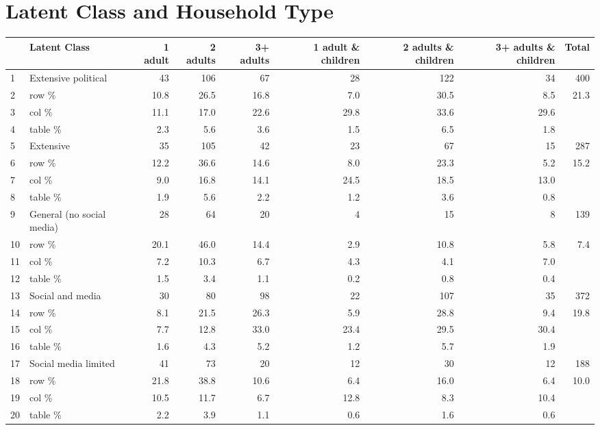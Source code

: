 \documentclass{article}
\begin{document}
\section{Latent Class and Household Type}

\begin{table}[ht]
\centering
\begin{tabular}{llrrrrrrr}
  \hline
 & Latent Class & 1 adult & 2 adults & 3+ adults & 1 adult \& children & 2 adults \& children & 3+ adults \& children & Total \\ 
  \hline
1 & Extensive political & 43 & 106 & 67 & 28 & 122 & 34 & 400 \\ 
  2 & row \% & 10.8 & 26.5 & 16.8 & 7.0 & 30.5 & 8.5 & 21.3 \\ 
  3 & col \% & 11.1 & 17.0 & 22.6 & 29.8 & 33.6 & 29.6 &  \\ 
  4 & table \% & 2.3 & 5.6 & 3.6 & 1.5 & 6.5 & 1.8 &  \\ 
  5 & Extensive & 35 & 105 & 42 & 23 & 67 & 15 & 287 \\ 
  6 & row \% & 12.2 & 36.6 & 14.6 & 8.0 & 23.3 & 5.2 & 15.2 \\ 
  7 & col \% & 9.0 & 16.8 & 14.1 & 24.5 & 18.5 & 13.0 &  \\ 
  8 & table \% & 1.9 & 5.6 & 2.2 & 1.2 & 3.6 & 0.8 &  \\ 
  9 & General (no social media) & 28 & 64 & 20 & 4 & 15 & 8 & 139 \\ 
  10 & row \% & 20.1 & 46.0 & 14.4 & 2.9 & 10.8 & 5.8 & 7.4 \\ 
  11 & col \% & 7.2 & 10.3 & 6.7 & 4.3 & 4.1 & 7.0 &  \\ 
  12 & table \% & 1.5 & 3.4 & 1.1 & 0.2 & 0.8 & 0.4 &  \\ 
  13 & Social and media & 30 & 80 & 98 & 22 & 107 & 35 & 372 \\ 
  14 & row \% & 8.1 & 21.5 & 26.3 & 5.9 & 28.8 & 9.4 & 19.8 \\ 
  15 & col \% & 7.7 & 12.8 & 33.0 & 23.4 & 29.5 & 30.4 &  \\ 
  16 & table \% & 1.6 & 4.3 & 5.2 & 1.2 & 5.7 & 1.9 &  \\ 
  17 & Social media limited & 41 & 73 & 20 & 12 & 30 & 12 & 188 \\ 
  18 & row \% & 21.8 & 38.8 & 10.6 & 6.4 & 16.0 & 6.4 & 10.0 \\ 
  19 & col \% & 10.5 & 11.7 & 6.7 & 12.8 & 8.3 & 10.4 &  \\ 
  20 & table \% & 2.2 & 3.9 & 1.1 & 0.6 & 1.6 & 0.6 &  \\ 

\end{tabular}
\end{table}
\end{document}

